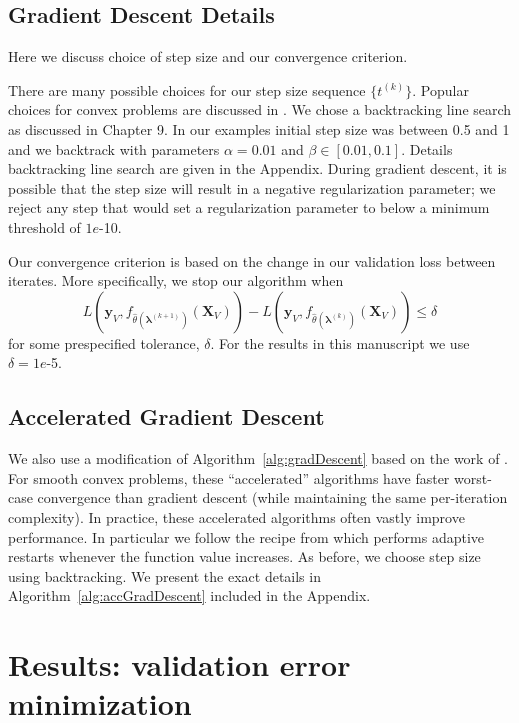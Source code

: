 \documentclass[10pt,letterpaper]{article}
\begin{document}
\subsection{Gradient Descent Details}\label{sec:alg_details}
Here we discuss choice of step size and our convergence criterion.

There are many possible choices for our step size sequence $\{t^{(k)}\}$. Popular choices for convex problems are discussed in \citet{boyd2004convex}. We chose a backtracking line search as discussed in Chapter 9. In our examples initial step size was between 0.5 and 1 and we backtrack with parameters $\alpha = 0.01$ and $\beta \in [0.01, 0.1]$. Details backtracking line search are given in the Appendix. During gradient descent, it is possible that the step size will result in a negative regularization parameter; we reject any step that would set a regularization parameter to below a minimum threshold of $1e$-10.

Our convergence criterion is based on the change in our validation loss between iterates. More specifically, we stop our algorithm when
\[
L \left( \boldsymbol{y}_V, f_{\hat{\theta}(\boldsymbol{\lambda}^{(k+1)})}(\boldsymbol{X}_V)\right) - L \left( \boldsymbol{y}_V, f_{\hat{\theta}(\boldsymbol{\lambda}^{(k)})}(\boldsymbol{X}_V)\right) \leq \delta
\]
for some prespecified tolerance, $\delta$. For the results in this manuscript we use $\delta = 1e$-5.

\subsection{Accelerated Gradient Descent}
We also use a modification of Algorithm~\ref{alg:gradDescent} based on the work of \citet{nesterov1983method}. For smooth convex problems, these ``accelerated'' algorithms have faster worst-case convergence than gradient descent (while maintaining the same per-iteration complexity). In practice, these accelerated algorithms often vastly improve performance. In particular we follow the recipe from \citet{o2013adaptive} which performs adaptive restarts whenever the function value increases. As before, we choose step size using backtracking. We present the exact details in Algorithm~\ref{alg:accGradDescent} included in the Appendix.

\section{Results: validation error minimization}\label{sec:results1}
\end{document}
